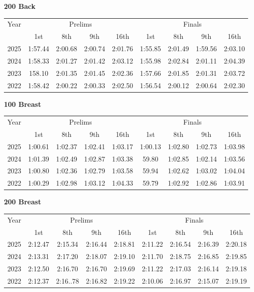 \clearpage
\textbf{200 Back}

\begin{flushleft}
\begin{tabular}{|c|c|c|c|c|c|c|c|c|}
\hline
Year & \multicolumn{4}{c|}{Prelims} & \multicolumn{4}{c|}{Finals} \\
\cline{2-9}
& 1st & 8th & 9th & 16th & 1st & 8th & 9th & 16th \\
\hline
2025 & 1:57.44 & 2:00.68 & 2:00.74 & 2:01.76 & 1:55.85 & 2:01.49 & 1:59.56 & 2:03.10 \\
2024 & 1:58.33 & 2:01.27 & 2:01.42 & 2:03.12 & 1:55.98 & 2:02.84 & 2:01.11 & 2:04.39 \\
2023 & 158.10 & 2:01.35 & 2:01.45 & 2:02.36 & 1:57.66 & 2:01.85 & 2:01.31 & 2:03.72 \\
2022 & 1:58.42 & 2:00.22 & 2:00.33 & 2:02.50 & 1:56.54 & 2:00.12 & 2:00.64 & 2:02.30 \\
\hline
\end{tabular}
\end{flushleft}

\textbf{100 Breast}

\begin{flushleft}
\begin{tabular}{|c|c|c|c|c|c|c|c|c|}
\hline
Year & \multicolumn{4}{c|}{Prelims} & \multicolumn{4}{c|}{Finals} \\
\cline{2-9}
& 1st & 8th & 9th & 16th & 1st & 8th & 9th & 16th \\
\hline
2025 & 1:00.61 & 1:02.37 & 1:02.41 & 1:03.17 & 1:00.13 & 1:02.80 & 1:02.73 & 1:03.98 \\
2024 & 1:01.39 & 1:02.49 & 1:02.87 & 1:03.38 & 59.80 & 1:02.85 & 1:02.14 & 1:03.56 \\
2023 & 1:00.80 & 1:02.36 & 1:02.79 & 1:03.58 & 59.94 & 1:02.62 & 1:03.02 & 1:04.04 \\
2022 & 1:00.29 & 1:02.98 & 1:03.12 & 1:04.33 & 59.79 & 1:02.92 & 1:02.86 & 1:03.91 \\
\hline
\end{tabular}
\end{flushleft}

\textbf{200 Breast}

\begin{flushleft}
\begin{tabular}{|c|c|c|c|c|c|c|c|c|}
\hline
Year & \multicolumn{4}{c|}{Prelims} & \multicolumn{4}{c|}{Finals} \\
\cline{2-9}
& 1st & 8th & 9th & 16th & 1st & 8th & 9th & 16th \\
\hline
2025 & 2:12.47 & 2:15.34 & 2:16.44 & 2:18.81 & 2:11.22 & 2:16.54 & 2:16.39 & 2:20.18 \\
2024 & 2:13.31 & 2:17.20 & 2:18.07 & 2:19.10 & 2:11.70 & 2:18.75 & 2:16.85 & 2:19.85 \\
2023 & 2:12.50 & 2:16.70 & 2:16.70 & 2:19.69 & 2:11.22 & 2:17.03 & 2:16.14 & 2:19.18 \\
2022 & 2:12.37 & 2:16..78 & 2:16.82 & 2:19.22 & 2:10.06 & 2:16.97 & 2:15.07 & 2:19.19 \\
\hline
\end{tabular}
\end{flushleft}


